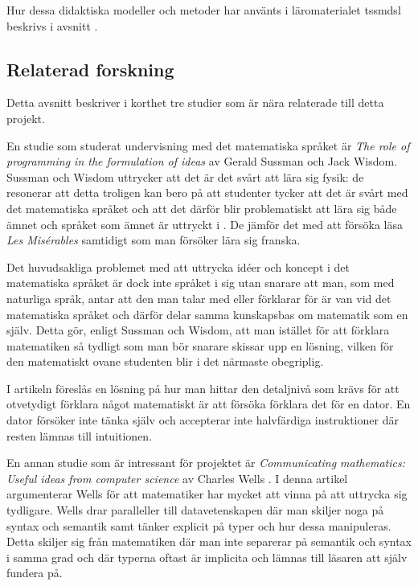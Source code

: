 \documentclass[12pt,a4paper,twoside,openright]{article}
\begin{document}
Hur dessa didaktiska modeller och metoder har använts i läromaterialet
\gls{tssmdsl} beskrivs i avsnitt .

\subsection{Relaterad forskning}
\label{sec:relForsk}
Detta avsnitt beskriver i korthet tre studier som är nära relaterade
till detta projekt.

En studie som studerat undervisning med det matematiska språket är
\textit{The role of programming in the formulation of ideas} av Gerald
Sussman och Jack Wisdom. Sussman och Wisdom uttrycker att det är det
svårt att lära sig fysik: de resonerar att detta troligen kan bero på
att studenter tycker att det är svårt med det matematiska språket och
att det därför blir problematiskt att lära sig både ämnet och språket
som ämnet är uttryckt i \cite{sussman2002role}. De jämför det med att
försöka läsa \textit{Les Misérables} samtidigt som man försöker lära
sig franska.

Det huvudsakliga problemet med att uttrycka idéer och koncept i det
matematiska språket är dock inte språket i sig utan snarare att man,
som med naturliga språk, antar att den man talar med eller förklarar
för är van vid det matematiska språket och därför delar samma
kunskapsbas om matematik som en själv. Detta gör, enligt Sussman och
Wisdom, att man istället för att förklara matematiken så tydligt som
man bör snarare skissar upp en lösning, vilken för den matematiskt
ovane studenten blir i det närmaste obegriplig.

I artikeln föreslås en lösning på hur man hittar den detaljnivå som
krävs för att otvetydigt förklara något matematiskt är att försöka
förklara det för en dator. En dator försöker inte tänka själv och
accepterar inte halvfärdiga instruktioner där resten lämnas till
intuitionen.

En annan studie som är intressant för projektet är
\textit{Communicating mathematics: Useful ideas from computer science}
av Charles Wells \cite{wells1995communicating}. I denna artikel
argumenterar Wells för att matematiker har mycket att vinna på att
uttrycka sig tydligare. Wells drar paralleller till datavetenskapen
där man skiljer noga på syntax och semantik samt tänker explicit på
typer och hur dessa manipuleras. Detta skiljer sig från matematiken
där man inte separerar på semantik och syntax i samma grad och där
typerna oftast är implicita och lämnas till läsaren att själv fundera
på.
\end{document}
